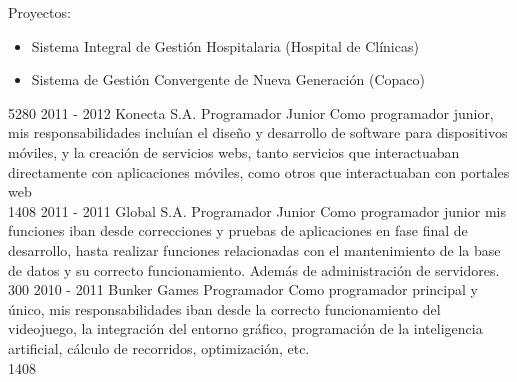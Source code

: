 \documentclass[]{friggeri-cv}
\begin{document}
\begin{entrylist}
{        Proyectos:
        \begin{itemize}
            \item Sistema Integral de Gestión Hospitalaria (Hospital de
                Clínicas)
            \item Sistema de Gestión Convergente de Nueva Generación (Copaco)
        \end{itemize}}
    {5280}
\entry
    {2011 - 2012}
    {Konecta S.A.}
    {Programador Junior}
    {Como programador junior, mis responsabilidades incluían el diseño y
        desarrollo de software para dispositivos móviles, y la creación de
        servicios webs, tanto servicios que interactuaban directamente con
        aplicaciones móviles, como otros que interactuaban con portales web
        \\}
    {1408}
\entry
    {2011 - 2011}
    {Global S.A.}
    {Programador Junior}
    {Como programador junior mis funciones iban desde correcciones y pruebas de
        aplicaciones en fase final de desarrollo, hasta realizar funciones
        relacionadas con el mantenimiento de la base de datos y su correcto
        funcionamiento. Además de administración de servidores. \\}
    {300}
\entry
    {2010 - 2011}
    {Bunker Games}
    {Programador}
    {Como programador principal y único, mis responsabilidades iban desde la
        correcto funcionamiento del videojuego, la integración del entorno
        gráfico, programación de la inteligencia artificial, cálculo de
        recorridos, optimización, etc. \\}
    {1408}

\end{entrylist}
\end{document}
